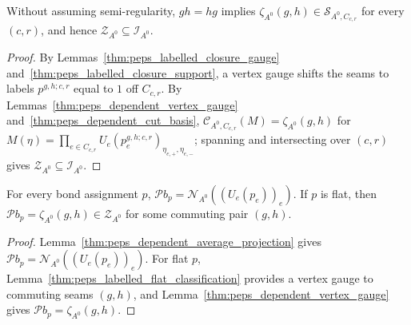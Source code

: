 \begin{lemma}%
    \label{thm:peps_full_four_cut_forward}
    \leanok
    Without assuming semi-regularity, $gh=hg$ implies
    $\zeta_{A^0}(g,h)\in\mathcal S_{A^0,C_{c,r}}$ for every $(c,r)$, and hence
    $\mathcal Z_{A^0}\subseteq\mathcal I_{A^0}$.
\end{lemma}
\begin{proof}\leanok
    By Lemmas~\ref{thm:peps_labelled_closure_gauge}
    and~\ref{thm:peps_labelled_closure_support}, a vertex gauge shifts the
    seams to labels $p^{g,h;c,r}$ equal to $1$ off $C_{c,r}$. By
    Lemmas~\ref{thm:peps_dependent_vertex_gauge}
    and~\ref{thm:peps_dependent_cut_basis}, $\mathcal C_{A^0,C_{c,r}}(M)=\zeta_{A^0}(g,h)$
    for $M(\eta)=\prod_{e\in C_{c,r}}U_e(p^{g,h;c,r}_e)_{\eta_{e,+},\eta_{e,-}}$;
    spanning and intersecting over $(c,r)$ gives
    $\mathcal Z_{A^0}\subseteq\mathcal I_{A^0}$.
\end{proof}

\begin{lemma}%
    \label{thm:peps_full_four_cut_flat_projection}
    \leanok
    For every bond assignment $p$,
    $\mathcal P b_p=\mathcal N_{A^0}((U_e(p_e))_e)$.
    If $p$ is flat, then $\mathcal P b_p=\zeta_{A^0}(g,h)\in\mathcal Z_{A^0}$
    for some commuting pair $(g,h)$.
\end{lemma}
\begin{proof}\leanok
    Lemma~\ref{thm:peps_dependent_average_projection} gives
    $\mathcal P b_p=\mathcal N_{A^0}((U_e(p_e))_e)$. For flat $p$,
    Lemma~\ref{thm:peps_labelled_flat_classification} provides a vertex
    gauge to commuting seams $(g,h)$, and
    Lemma~\ref{thm:peps_dependent_vertex_gauge} gives
    $\mathcal P b_p=\zeta_{A^0}(g,h)$.
\end{proof}

